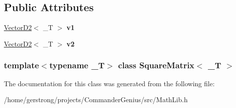 \subsection*{Public Attributes}
\begin{DoxyCompactItemize}
\item 
\hypertarget{class_square_matrix_aff8dfe048dbc6354860bbac8712464d8}{
\hyperlink{struct_vector_d2}{VectorD2}$<$ \_\-T $>$ {\bfseries v1}}
\label{class_square_matrix_aff8dfe048dbc6354860bbac8712464d8}

\item 
\hypertarget{class_square_matrix_ab9c2d5657c767cf4e0e8863355f0366a}{
\hyperlink{struct_vector_d2}{VectorD2}$<$ \_\-T $>$ {\bfseries v2}}
\label{class_square_matrix_ab9c2d5657c767cf4e0e8863355f0366a}

\end{DoxyCompactItemize}
\subsubsection*{template$<$typename \_\-T$>$ class SquareMatrix$<$ \_\-T $>$}



The documentation for this class was generated from the following file:\begin{DoxyCompactItemize}
\item 
/home/gerstrong/projects/CommanderGenius/src/MathLib.h\end{DoxyCompactItemize}
